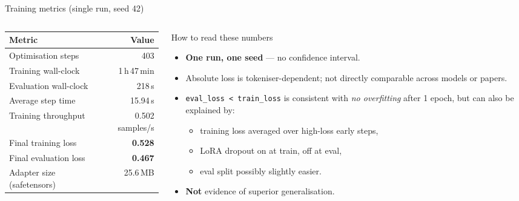 \documentclass[aspectratio=169, 10pt]{beamer}
\begin{document}
\begin{frame}{Training metrics (single run, seed 42)}
  \begin{columns}[T]
    \begin{column}{0.48\textwidth}
      \centering\scriptsize
      \begin{tabular}{lr}
        \toprule
        \textbf{Metric} & \textbf{Value} \\
        \midrule
        Optimisation steps          & 403 \\
        Training wall-clock         & 1\,h\,47\,min \\
        Evaluation wall-clock       & 218\,s \\
        Average step time           & 15.94\,s \\
        Training throughput         & 0.502 samples/s \\
        Final training loss         & \textbf{0.528} \\
        Final evaluation loss       & \textbf{0.467} \\
        Adapter size (safetensors)  & 25.6\,MB \\
        \bottomrule
      \end{tabular}
    \end{column}
    \begin{column}{0.48\textwidth}
      \begin{alertblock}{How to read these numbers}
        \scriptsize
        \begin{itemize}
          \item \textbf{One run, one seed} --- no confidence interval.
          \item Absolute loss is tokeniser-dependent; not directly
                comparable across models or papers.
          \item \texttt{eval\_loss < train\_loss} is consistent with
                \emph{no overfitting} after 1 epoch, but can also be
                explained by:
            \begin{itemize}\tiny
              \item training loss averaged over high-loss early steps,
              \item LoRA dropout on at train, off at eval,
              \item eval split possibly slightly easier.
            \end{itemize}
          \item \textbf{Not} evidence of superior generalisation.
        \end{itemize}
      \end{alertblock}
    \end{column}
  \end{columns}
\end{frame}
\end{document}
